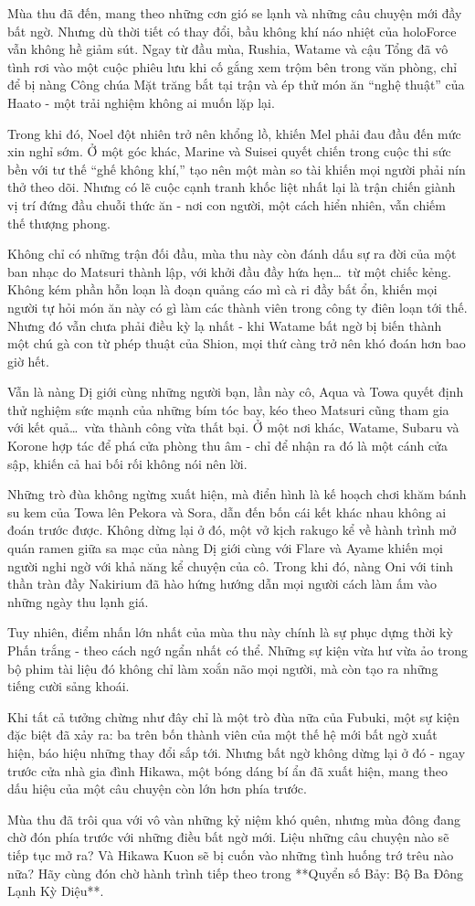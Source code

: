 \documentclass[main.tex]{subfiles}
\begin{document}
\color{black}
Mùa thu đã đến, mang theo những cơn gió se lạnh và những câu chuyện mới đầy bất ngờ. Nhưng dù thời tiết có thay đổi, bầu không khí náo nhiệt của holoForce vẫn không hề giảm sút. Ngay từ đầu mùa, Rushia, Watame và cậu Tổng đã vô tình rơi vào một cuộc phiêu lưu khi cố gắng xem trộm bên trong văn phòng, chỉ để bị nàng Công chúa Mặt trăng bắt tại trận và ép thử món ăn ``nghệ thuật'' của Haato - một trải nghiệm không ai muốn lặp lại.

Trong khi đó, Noel đột nhiên trở nên khổng lồ, khiến Mel phải đau đầu đến mức xin nghỉ sớm. Ở một góc khác, Marine và Suisei quyết chiến trong cuộc thi sức bền với tư thế ``ghế không khí,'' tạo nên một màn so tài khiến mọi người phải nín thở theo dõi. Nhưng có lẽ cuộc cạnh tranh khốc liệt nhất lại là trận chiến giành vị trí đứng đầu chuỗi thức ăn - nơi con người, một cách hiển nhiên, vẫn chiếm thế thượng phong.

Không chỉ có những trận đối đầu, mùa thu này còn đánh dấu sự ra đời của một ban nhạc do Matsuri thành lập, với khởi đầu đầy hứa hẹn\dots\ từ một chiếc kẻng. Không kém phần hỗn loạn là đoạn quảng cáo mì cà ri đầy bất ổn, khiến mọi người tự hỏi món ăn này có gì làm các thành viên trong công ty điên loạn tới thế. Nhưng đó vẫn chưa phải điều kỳ lạ nhất - khi Watame bất ngờ bị biến thành một chú gà con từ phép thuật của Shion, mọi thứ càng trở nên khó đoán hơn bao giờ hết.

Vẫn là nàng Dị giới cùng những người bạn, lần này cô, Aqua và Towa quyết định thử nghiệm sức mạnh của những bím tóc bay, kéo theo Matsuri cũng tham gia với kết quả\dots\ vừa thành công vừa thất bại. Ở một nơi khác, Watame, Subaru và Korone hợp tác để phá cửa phòng thu âm - chỉ để nhận ra đó là một cánh cửa sập, khiến cả hai bối rối không nói nên lời.

Những trò đùa không ngừng xuất hiện, mà điển hình là kế hoạch chơi khăm bánh su kem của Towa lên Pekora và Sora, dẫn đến bốn cái kết khác nhau không ai đoán trước được. Không dừng lại ở đó, một vở kịch rakugo kể về hành trình mở quán ramen giữa sa mạc của nàng Dị giới cùng với Flare và Ayame khiến mọi người nghi ngờ với khả năng kể chuyện của cô. Trong khi đó, nàng Oni với tinh thần tràn đầy Nakirium đã hào hứng hướng dẫn mọi người cách làm ấm vào những ngày thu lạnh giá.

Tuy nhiên, điểm nhấn lớn nhất của mùa thu này chính là sự phục dựng thời kỳ Phấn trắng - theo cách ngớ ngẩn nhất có thể. Những sự kiện vừa hư vừa ảo trong bộ phim tài liệu đó không chỉ làm xoắn não mọi người, mà còn tạo ra những tiếng cười sảng khoái.

Khi tất cả tưởng chừng như đây chỉ là một trò đùa nữa của Fubuki, một sự kiện đặc biệt đã xảy ra: ba trên bốn thành viên của một thế hệ mới bất ngờ xuất hiện, báo hiệu những thay đổi sắp tới. Nhưng bất ngờ không dừng lại ở đó - ngay trước cửa nhà gia đình Hikawa, một bóng dáng bí ẩn đã xuất hiện, mang theo dấu hiệu của một câu chuyện còn lớn hơn phía trước.

Mùa thu đã trôi qua với vô vàn những kỷ niệm khó quên, nhưng mùa đông đang chờ đón phía trước với những điều bất ngờ mới. Liệu những câu chuyện nào sẽ tiếp tục mở ra? Và Hikawa Kuon sẽ bị cuốn vào những tình huống trớ trêu nào nữa? Hãy cùng đón chờ hành trình tiếp theo trong **Quyển số Bảy: Bộ Ba Đông Lạnh Kỳ Diệu**.
\end{document}
